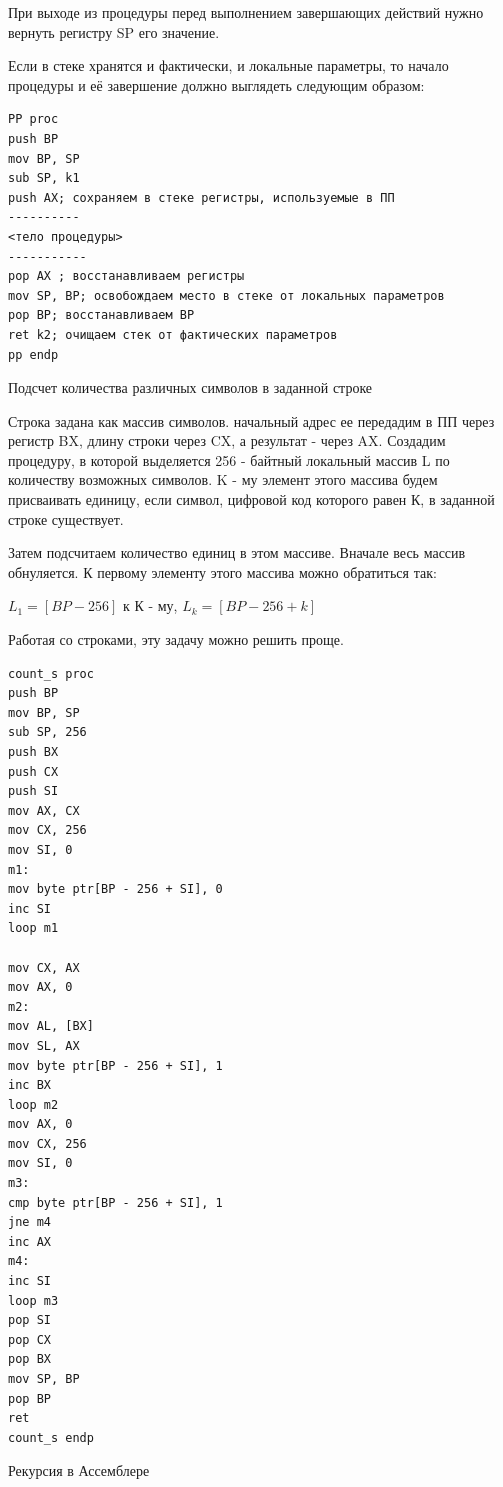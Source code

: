 При выходе из процедуры перед выполнением завершающих действий нужно вернуть регистру SP его значение.

Если в стеке хранятся и фактически, и локальные параметры, то начало процедуры и её завершение должно выглядеть следующим образом:

\begin{verbatim}
PP proc
push BP
mov BP, SP
sub SP, k1
push AX; сохраняем в стеке регистры, используемые в ПП
----------
<тело процедуры>
-----------
pop AX ; восстанавливаем регистры
mov SP, BP; освобождаем место в стеке от локальных параметров
pop BP; восстанавливаем BP
ret k2; очищаем стек от фактических параметров
pp endp
\end{verbatim}

Подсчет количества различных символов в заданной строке

Строка задана как массив символов. начальный адрес ее передадим в ПП через регистр BX, длину строки через CX, а результат - через AX. Создадим процедуру, в которой выделяется 256 - байтный локальный массив L по количеству возможных символов. K - му элемент этого массива будем присваивать единицу, если символ, цифровой код которого равен К, в заданной строке существует. 

Затем подсчитаем количество единиц в этом массиве. Вначале весь массив обнуляется. К первому элементу этого массива можно обратиться так:

$L_1 = [BP - 256]$ к К - му, $L_k = [BP - 256 + k]$

Работая со строками, эту задачу можно решить проще.

\begin{verbatim}
count_s proc
push BP
mov BP, SP
sub SP, 256
push BX
push CX
push SI
mov AX, CX
mov CX, 256
mov SI, 0
m1:
mov byte ptr[BP - 256 + SI], 0
inc SI
loop m1

mov CX, AX
mov AX, 0
m2:
mov AL, [BX]
mov SL, AX
mov byte ptr[BP - 256 + SI], 1
inc BX
loop m2
mov AX, 0
mov CX, 256
mov SI, 0
m3:
cmp byte ptr[BP - 256 + SI], 1
jne m4
inc AX
m4:
inc SI
loop m3
pop SI
pop CX
pop BX
mov SP, BP
pop BP
ret
count_s endp
\end{verbatim}

Рекурсия в Ассемблере


